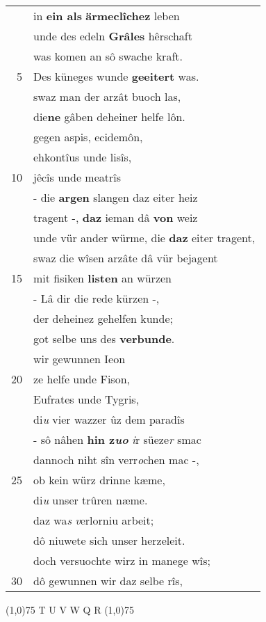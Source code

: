 \documentclass[8pt,a4paper,notitlepage]{article}
\begin{document}
\begin{table}[ht]
\begin{minipage}[t]{0.5\linewidth}
\begin{tabular}{rl}
 & in \textbf{ein als} \textbf{ärmeclîchez} leben\\ 
 & unde des edeln \textbf{Grâles} hêrschaft\\ 
 & was komen an sô swache kraft.\\ 
5 & Des küneges wunde \textbf{geeitert} was.\\ 
 & swaz man der arzât buoch las,\\ 
 & die\textbf{ne} gâben deheiner helfe lôn.\\ 
 & gegen aspis, ecidemôn,\\ 
 & ehkontîus unde lisîs,\\ 
10 & jêcîs unde meatrîs\\ 
 & - die \textbf{argen} slangen daz eiter heiz\\ 
 & tragent -, \textbf{daz} ieman dâ \textbf{von} weiz\\ 
 & unde vür ander würme, die \textbf{daz} eiter tragent,\\ 
 & swaz die wîsen arzâte dâ vür bejagent\\ 
15 & mit fisiken \textbf{listen} an würzen\\ 
 & - Lâ dir die rede kürzen -,\\ 
 & der deheinez gehelfen kunde;\\ 
 & got selbe uns des \textbf{verbunde}.\\ 
 & wir gewunnen Ieon\\ 
20 & ze helfe unde Fison,\\ 
 & Eufrates unde Tygris,\\ 
 & di\textit{u} vier wazzer ûz dem paradîs\\ 
 & - sô nâhen \textbf{hin z\textit{uo}} \textit{i}r süeze\textit{r} smac\\ 
 & dannoch niht sîn verr\textit{o}chen mac -,\\ 
25 & ob kein würz drinne kæme,\\ 
 & di\textit{u} unser trûren næme.\\ 
 & daz wa\textit{s} \textit{v}erlorniu arbeit;\\ 
 & dô niuwete sich unser herzeleit.\\ 
 & doch versuochte wirz in manege wîs;\\ 
30 & dô gewunnen wir daz selbe rîs,\\ 
\end{tabular}
\scriptsize
\line(1,0){75} \newline
T U V W Q R \newline
\line(1,0){75} \newline

\end{minipage}
\end{table}
\end{document}
